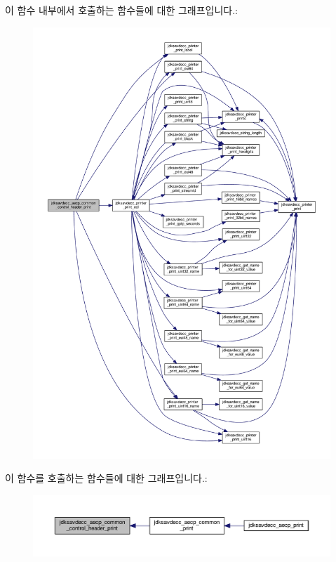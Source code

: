 이 함수 내부에서 호출하는 함수들에 대한 그래프입니다.\+:
\nopagebreak
\begin{figure}[H]
\begin{center}
\leavevmode
\includegraphics[width=350pt]{group__aecp__print_ga2ef82802e058fc512eccb51f8611fab6_cgraph}
\end{center}
\end{figure}




이 함수를 호출하는 함수들에 대한 그래프입니다.\+:
\nopagebreak
\begin{figure}[H]
\begin{center}
\leavevmode
\includegraphics[width=350pt]{group__aecp__print_ga2ef82802e058fc512eccb51f8611fab6_icgraph}
\end{center}
\end{figure}


